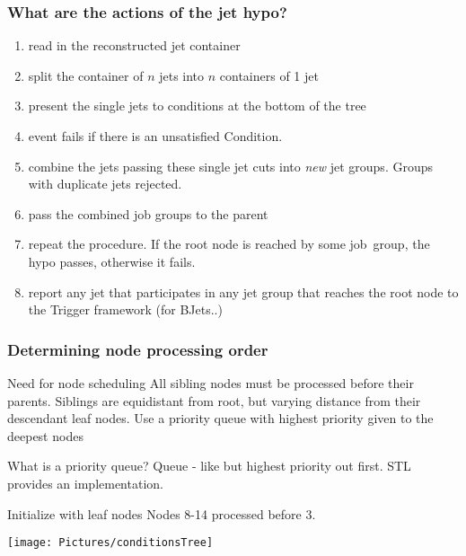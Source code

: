 \documentclass{beamer}
\begin{document}
\frame
{
 \frametitle{What are the actions of the jet hypo?}
 \begin{block}{}
  \begin{enumerate}
\item read in the reconstructed jet container
\item split the container of $n$ jets into $n$ containers of 1 jet
\item present the single jets to conditions at the bottom of the tree
\item event fails if there is an unsatisfied Condition.
\item combine the jets passing these single jet cuts into {\it new} jet groups. Groups with duplicate jets rejected.
\item pass the combined job groups to the parent
\item repeat the procedure. If the root node is reached by some job~group, the hypo passes, otherwise it fails.
\item report any jet that participates in any jet group that reaches the root node to the Trigger framework (for BJets..)
\end{enumerate}
\end{block}
}


\frame
{
\frametitle{Determining node processing order}

\begin{minipage}[T]{0.58\linewidth}
\begin{block}{Need for node scheduling}
All sibling nodes must be processed before their parents. Siblings are equidistant from root, but varying distance from
their descendant leaf nodes. Use a \alert{priority queue} with highest priority given to the deepest nodes
\end{block}

\begin{block}{What is a priority queue?}
Queue - like but highest priority out first. 
STL provides an implementation.
\end{block}
\begin{block}{Initialize with leaf nodes}
Nodes 8-14 processed before 3. 
\end{block}

\end{minipage}%
\begin{minipage}[T]{0.38\linewidth}

\texttt{[image: Pictures/conditionsTree]}
\end{minipage}
%
%
}
\end{document}
